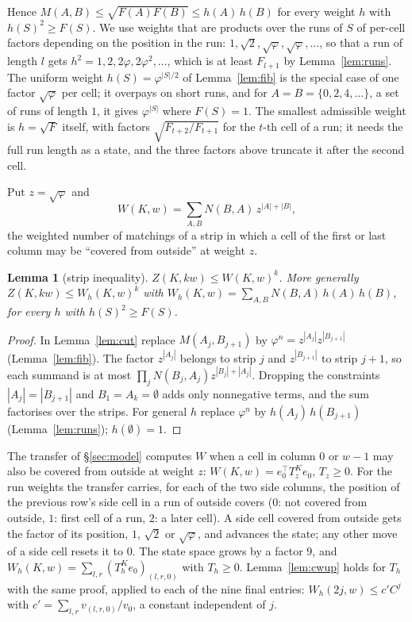\documentclass[11pt]{amsart}
\newtheorem{lemma}[theorem]{Lemma}
\theoremstyle{definition}
\theoremstyle{remark}
\begin{document}
Hence $M(A, B) \le \sqrt{F(A) F(B)} \le h(A)\, h(B)$ for every weight $h$ with $h(S)^2 \ge F(S)$.
We use weights that are products over the runs of $S$ of per-cell factors depending on the position
in the run: $1, \sqrt2, \sqrt\varphi, \sqrt\varphi, \dots$, so that a run of length $l$ gets
$h^2 = 1, 2, 2\varphi, 2\varphi^2, \dots$, which is at least $F_{l+1}$ by Lemma~\ref{lem:runs}. The
uniform weight $h(S) = \varphi^{|S|/2}$ of Lemma~\ref{lem:fib} is the special case of one factor
$\sqrt\varphi$ per cell; it overpays on short runs, and for $A = B = \{0, 2, 4, \dots\}$, a set of
runs of length $1$, it gives $\varphi^{|S|}$ where $F(S) = 1$. The smallest admissible weight is
$h = \sqrt F$ itself, with factors $\sqrt{F_{t+2}/F_{t+1}}$ for the $t$-th cell of a run; it needs
the full run length as a state, and the three factors above truncate it after the second cell.

Put $z = \sqrt\varphi$ and
\[
  W(K, w) = \sum_{A, B} N(B, A)\, z^{|A| + |B|},
\]
the weighted number of matchings of a strip in which a cell of the first or last column may be
``covered from outside'' at weight $z$.

\begin{lemma}[strip inequality]\label{lem:strip}
$Z(K, kw) \le W(K, w)^k$. More generally $Z(K, kw) \le W_h(K, w)^k$ with
$W_h(K, w) = \sum_{A, B} N(B, A)\, h(A)\, h(B)$, for every $h$ with $h(S)^2 \ge F(S)$.
\end{lemma}
\begin{proof}
In Lemma~\ref{lem:cut} replace $M(A_j, B_{j+1})$ by $\varphi^n = z^{|A_j|} z^{|B_{j+1}|}$
(Lemma~\ref{lem:fib}). The factor $z^{|A_j|}$ belongs to strip $j$ and $z^{|B_{j+1}|}$ to strip
$j+1$, so each summand is at most $\prod_j N(B_j, A_j) z^{|B_j| + |A_j|}$. Dropping the constraints
$|A_j| = |B_{j+1}|$ and $B_1 = A_k = \emptyset$ adds only nonnegative terms, and the sum
factorises over the strips. For general $h$ replace $\varphi^n$ by $h(A_j)\, h(B_{j+1})$
(Lemma~\ref{lem:runs}); $h(\emptyset) = 1$.
\end{proof}

The transfer of \S\ref{sec:model} computes $W$ when a cell in column $0$ or $w-1$ may also be
covered from outside at weight $z$: $W(K, w) = e_0^\top T_z^K e_0$, $T_z \ge 0$. For the run weights
the transfer carries, for each of the two side columns, the position of the previous row's side
cell in a run of outside covers ($0$: not covered from outside, $1$: first cell of a run, $2$: a
later cell). A side cell covered from outside gets the factor of its position, $1$, $\sqrt2$ or
$\sqrt\varphi$, and advances the state; any other move of a side cell resets it to $0$. The state
space grows by a factor $9$, and $W_h(K, w) = \sum_{l, r} (T_h^K e_{0})_{(l, r, 0)}$ with
$T_h \ge 0$. Lemma~\ref{lem:cwup} holds for $T_h$ with the same proof, applied to each of the nine
final entries: $W_h(2j, w) \le c' C^j$ with $c' = \sum_{l, r} v_{(l, r, 0)} / v_0$, a constant
independent of $j$.
\end{document}
